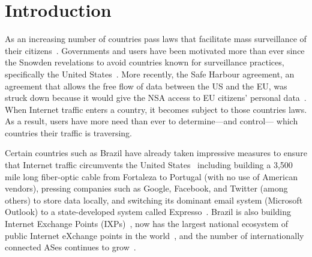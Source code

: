 \section{Introduction}
\label{intro}

As an increasing number of countries pass laws that facilitate mass
surveillance of their citizens~\cite{france_surveillance,
  netherlands_surveillance, kazak_surveillance, uk_bill}.  Governments
and users have been motivated more than ever since the Snowden
revelations to avoid countries known for surveillance practices,
specifically the United States~\cite{russia_secure_internet,
  routing_errors, dte}.  More recently, the Safe Harbour agreement, an
agreement that allows the free flow of data between the US and the EU,
was struck down because it would give the NSA access to EU citizens'
personal data~\cite{safe_harbour_illegal, safe_harbour_undecided}.  When
Internet traffic enters a country, it becomes subject to those countries
laws.  As a result, users have more need than ever to determine---and
control--- which countries their traffic is traversing.

Certain countries such as Brazil have already taken impressive measures
to ensure that Internet traffic circumvents the United
States~\cite{brazil_history, brazil_break_from_US, brazil_conference,
  brazil_conference2, brazil_human_rights} including building a 3,500
mile long fiber-optic cable from Fortaleza to Portugal (with no use of
American vendors), pressing companies such as Google, Facebook, and
Twitter (among others) to store data locally, and switching its dominant
email system (Microsoft Outlook) to a state-developed system called
Expresso~\cite{brazil_cable, brazil_us_companies}.  Brazil is also
building Internet Exchange Points (IXPs)~\cite{brazil_IXP1}, now has the
largest national ecosystem of public Internet eXchange points in the
world~\cite{brazil_ixp_ecosystem}, and the number of internationally
connected ASes continues to grow~\cite{brazil_international_ases}.  

